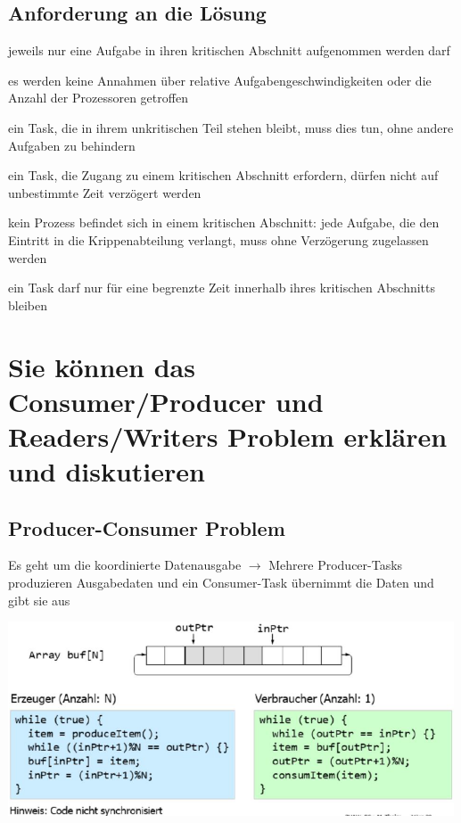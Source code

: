 \documentclass{report}
\newenvironment{Figure}
	{\par\medskip\noindent\minipage{\linewidth}}
	{\endminipage\par\medskip}
\theoremstyle{definition}
\theoremstyle{example}
\begin{document}
	\subsection{Anforderung an die Lösung}
\begin{enumeration}
	\item jeweils nur eine Aufgabe in ihren kritischen Abschnitt aufgenommen werden darf
	\item es werden keine Annahmen über relative Aufgabengeschwindigkeiten oder die Anzahl der Prozessoren getroffen
	\item ein Task, die in ihrem unkritischen Teil stehen bleibt, muss dies tun, ohne andere Aufgaben zu behindern
	\item ein Task, die Zugang zu einem kritischen Abschnitt erfordern, dürfen nicht auf unbestimmte Zeit verzögert werden
	\item kein Prozess befindet sich in einem kritischen Abschnitt: jede Aufgabe, die den Eintritt in die Krippenabteilung verlangt, muss ohne Verzögerung zugelassen werden
	\item ein Task darf nur für eine begrenzte Zeit innerhalb ihres kritischen Abschnitts bleiben
\end{enumeration}



\section{Sie können das Consumer/Producer und Readers/Writers Problem erklären und diskutieren}
	\subsection{Producer-Consumer Problem}
Es geht um die koordinierte Datenausgabe $\rightarrow$ Mehrere Producer-Tasks produzieren Ausgabedaten und ein Consumer-Task übernimmt die Daten und gibt sie aus
\begin{Figure}
\centering
\includegraphics[width=500px]{img/gemRingBuffer.png}
	\label{fig:Beispiel einer Lösung für das Producer-Consumer-Problem}
\end{Figure}
\end{document}
